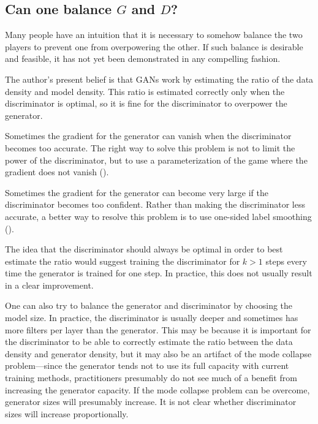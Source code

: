 \subsection{Can one balance $G$ and $D$?}

Many people have an intuition that it is necessary to somehow balance the two players
to prevent one from overpowering the other.
If such balance is desirable and feasible, it has not yet been demonstrated in any
compelling fashion.

The author's present belief is that GANs work by estimating the ratio of the data density
and model density. This ratio is estimated correctly only when the discriminator is
optimal, so it is fine for the discriminator to overpower the generator.

Sometimes the gradient for the generator can vanish when the discriminator becomes
too accurate.
The right way to solve this problem is not to limit the power of the discriminator,
but to use a parameterization of the game where the gradient does not vanish
().

Sometimes the gradient for the generator can become very large if the discriminator
becomes too confident. Rather than making the discriminator less accurate, a better
way to resolve this problem is to use one-sided label smoothing ().

The idea that the discriminator should always be optimal in order to best estimate
the ratio would suggest training the discriminator for $k > 1$ steps every time
the generator is trained for one step. In practice, this does not usually result in a
clear improvement.

One can also try to balance the generator and discriminator by choosing the model
size.
In practice, the discriminator is usually deeper and sometimes has more filters
per layer than the generator.
This may be because it is important for the discriminator to be able to correctly
estimate the ratio between the data density and generator density, but it may
also be an artifact of the mode collapse problem---since the generator tends not
to use its full capacity with current training methods, practitioners presumably
do not see much of a benefit from increasing the generator capacity.
If the mode collapse problem can be overcome, generator sizes will presumably
increase. It is not clear whether discriminator sizes will increase proportionally.


